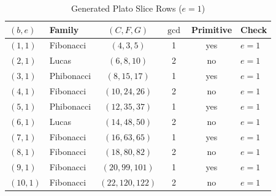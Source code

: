 \documentclass[12pt]{article}
\begin{document}
\begin{table}[h!]
\centering
\caption{Generated Plato Slice Rows ($e=1$)}
\label{tab:appendix_plato}
\small
\begin{tabular}{llcccl}
\toprule
\textbf{$(b,e)$} & \textbf{Family} & \textbf{$(C,F,G)$} & \textbf{$\gcd$} & \textbf{Primitive} & \textbf{Check} \\
\midrule
$(1,1)$ & Fibonacci & $(4,3,5)$ & 1 & yes & $e=1$ \\
$(2,1)$ & Lucas & $(6,8,10)$ & 2 & no & $e=1$ \\
$(3,1)$ & Phibonacci & $(8,15,17)$ & 1 & yes & $e=1$ \\
$(4,1)$ & Fibonacci & $(10,24,26)$ & 2 & no & $e=1$ \\
$(5,1)$ & Phibonacci & $(12,35,37)$ & 1 & yes & $e=1$ \\
$(6,1)$ & Lucas & $(14,48,50)$ & 2 & no & $e=1$ \\
$(7,1)$ & Fibonacci & $(16,63,65)$ & 1 & yes & $e=1$ \\
$(8,1)$ & Fibonacci & $(18,80,82)$ & 2 & no & $e=1$ \\
$(9,1)$ & Fibonacci & $(20,99,101)$ & 1 & yes & $e=1$ \\
$(10,1)$ & Fibonacci & $(22,120,122)$ & 2 & no & $e=1$ \\
\bottomrule
\end{tabular}
\end{table}
\end{document}
